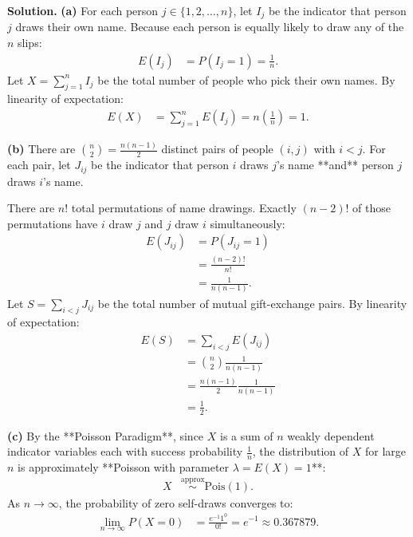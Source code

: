 \documentclass[11pt,a4paper]{article}
\begin{document}
\noindent \textbf{Solution.} \textbf{(a)} For each person $j \in \{1, 2, \dots, n\}$, let $I_j$ be the indicator that person $j$ draws their own name. Because each person is equally likely to draw any of the $n$ slips:
\begin{align*}
E(I_j) &= P(I_j = 1) = \frac{1}{n}.
\end{align*}
Let $X = \sum_{j=1}^{n} I_j$ be the total number of people who pick their own names. By linearity of expectation:
\begin{align*}
E(X) &= \sum_{j=1}^{n} E(I_j) = n \left(\frac{1}{n}\right) = 1.
\end{align*}

\vspace{4pt}
\noindent \textbf{(b)} There are $\binom{n}{2} = \frac{n(n-1)}{2}$ distinct pairs of people $(i, j)$ with $i < j$. For each pair, let $J_{ij}$ be the indicator that person $i$ draws $j$'s name **and** person $j$ draws $i$'s name. 

There are $n!$ total permutations of name drawings. Exactly $(n-2)!$ of those permutations have $i$ draw $j$ and $j$ draw $i$ simultaneously:
\begin{align*}
E(J_{ij}) &= P(J_{ij} = 1) \\
&= \frac{(n - 2)!}{n!} \\
&= \frac{1}{n(n - 1)}.
\end{align*}
Let $S = \sum_{i < j} J_{ij}$ be the total number of mutual gift-exchange pairs. By linearity of expectation:
\begin{align*}
E(S) &= \sum_{i < j} E(J_{ij}) \\
&= \binom{n}{2} \frac{1}{n(n - 1)} \\
&= \frac{n(n - 1)}{2} \frac{1}{n(n - 1)} \\
&= \frac{1}{2}.
\end{align*}

\vspace{4pt}
\noindent \textbf{(c)} By the **Poisson Paradigm**, since $X$ is a sum of $n$ weakly dependent indicator variables each with success probability $\frac{1}{n}$, the distribution of $X$ for large $n$ is approximately **Poisson with parameter $\lambda = E(X) = 1$**:
\begin{align*}
X &\stackrel{\text{approx}}{\sim} \text{Pois}(1).
\end{align*}
As $n \to \infty$, the probability of zero self-draws converges to:
\begin{align*}
\lim_{n \to \infty} P(X = 0) &= \frac{e^{-1} 1^0}{0!} = e^{-1} \approx 0.367879.
\end{align*}
\end{document}
